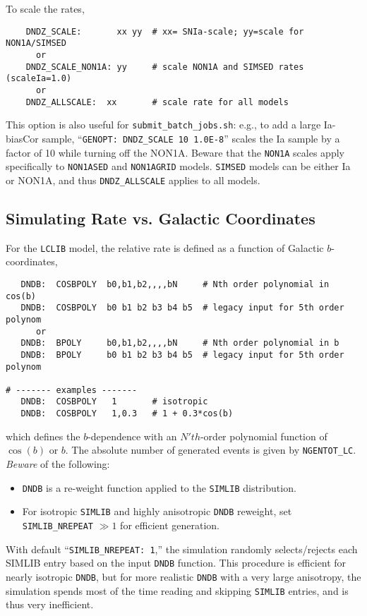 \documentclass[12pt]{article}
\newcommand{\submit}{\tt submit\_batch\_jobs.sh}
\begin{document}
\bigskip
To scale the rates,
\begin{verbatim}
    DNDZ_SCALE:       xx yy  # xx= SNIa-scale; yy=scale for NON1A/SIMSED
      or
    DNDZ_SCALE_NON1A: yy     # scale NON1A and SIMSED rates (scaleIa=1.0)
      or
    DNDZ_ALLSCALE:  xx       # scale rate for all models
\end{verbatim}
This option is also useful for {\submit}:
e.g., to add a large Ia-biasCor sample, 
``{\tt GENOPT:  DNDZ\_SCALE 10 1.0E-8}'' scales the
Ia sample by a factor of 10 while turning off the NON1A.
Beware that the {\tt NON1A} scales apply specifically
to {\tt NON1ASED} and {\tt NON1AGRID} models.
{\tt SIMSED} models can be either Ia or NON1A, and thus
{\tt DNDZ\_ALLSCALE} applies to all models.

\clearpage 
\subsection{Simulating Rate vs. Galactic Coordinates}
\label{subsec:DNDB}

For the {\tt LCLIB} model, the relative rate is defined as a 
function of Galactic $b$-coordinates,
\begin{verbatim}
   DNDB:  COSBPOLY  b0,b1,b2,,,,bN     # Nth order polynomial in cos(b)
   DNDB:  COSBPOLY  b0 b1 b2 b3 b4 b5  # legacy input for 5th order polynom
      or
   DNDB:  BPOLY     b0,b1,b2,,,,bN     # Nth order polynomial in b
   DNDB:  BPOLY     b0 b1 b2 b3 b4 b5  # legacy input for 5th order polynom 

# ------- examples -------
   DNDB:  COSBPOLY   1       # isotropic
   DNDB:  COSBPOLY   1,0.3   # 1 + 0.3*cos(b)
\end{verbatim}
%
which defines the $b$-dependence with an $N'th$-order
polynomial function of $\cos(b)$ or $b$.
The absolute number of generated events is given by
{\tt NGENTOT\_LC}.  {\it Beware} of the following:
\vspace{-0.4cm}
\begin{itemize}[noitemsep]
  \item {\tt DNDB} is a re-weight function applied to the {\tt SIMLIB} 
         distribution. 
  \item For isotropic {\tt SIMLIB} and highly anisotropic {\tt DNDB}
        reweight, set {\tt SIMLIB\_NREPEAT} $\gg1$ for efficient generation.
\end{itemize}

With default ``{\tt SIMLIB\_NREPEAT: 1},'' the simulation randomly
selects/rejects each SIMLIB entry based on the input {\tt DNDB} function.
This procedure is efficient for nearly isotropic {\tt DNDB},
but for more realistic {\tt DNDB} with a very large anisotropy,
the simulation spends most of the time reading and skipping {\tt SIMLIB}
entries, and is thus very inefficient.
\end{document}
